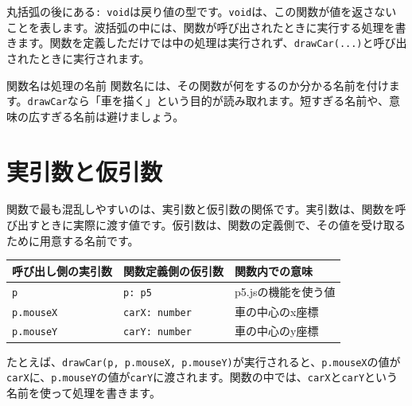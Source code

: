 丸括弧の後にある\texttt{: void}は戻り値の型です。\texttt{void}は、この関数が値を返さないことを表します。波括弧の中には、関数が呼び出されたときに実行する処理を書きます。関数を定義しただけでは中の処理は実行されず、\texttt{drawCar(...)}と呼び出されたときに実行されます。

\begin{notebox}{関数名は処理の名前}
関数名には、その関数が何をするのか分かる名前を付けます。\texttt{drawCar}なら「車を描く」という目的が読み取れます。短すぎる名前や、意味の広すぎる名前は避けましょう。
\end{notebox}

\section{実引数と仮引数}

関数で最も混乱しやすいのは、実引数と仮引数の関係です。実引数は、関数を呼び出すときに実際に渡す値です。仮引数は、関数の定義側で、その値を受け取るために用意する名前です。

\begin{center}
\begin{tabular}{lll}
\toprule
呼び出し側の実引数 & 関数定義側の仮引数 & 関数内での意味 \\
\midrule
\texttt{p} & \texttt{p: p5} & p5.jsの機能を使う値 \\
\texttt{p.mouseX} & \texttt{carX: number} & 車の中心のx座標 \\
\texttt{p.mouseY} & \texttt{carY: number} & 車の中心のy座標 \\
\bottomrule
\end{tabular}
\end{center}

たとえば、\texttt{drawCar(p, p.mouseX, p.mouseY)}が実行されると、\texttt{p.mouseX}の値が\texttt{carX}に、\texttt{p.mouseY}の値が\texttt{carY}に渡されます。関数の中では、\texttt{carX}と\texttt{carY}という名前を使って処理を書きます。

